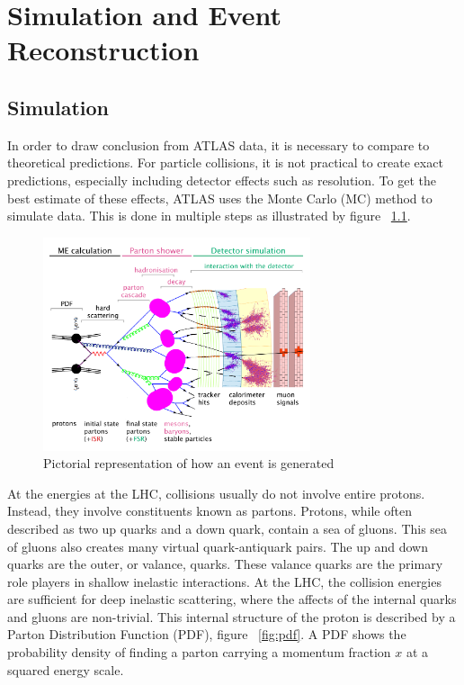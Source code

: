 \chapter{Simulation and Event Reconstruction}

\section{Simulation}
In order to draw conclusion from ATLAS data, it is necessary to compare to theoretical predictions. For particle collisions, it is not practical to create exact predictions, especially including detector effects such as resolution. To get the best estimate of these effects, ATLAS uses the Monte Carlo (MC) method to simulate data. This is done in multiple steps as illustrated by figure ~\ref{fig:eventsim}. \newline

\begin{figure}[h]
\begin{center}
\includegraphics*[width=0.70\textwidth] {figures/event_simulation}
\caption{Pictorial representation of how an event is generated \cite{Wanotayaroj:2242196}}
\label{fig:eventsim}
\end{center}
\end{figure}


\indent At the energies at the LHC, collisions usually do not involve entire protons. Instead, they involve constituents known as partons. Protons, while often described as two up quarks and a down quark, contain a sea of gluons. This sea of gluons also creates many virtual quark-antiquark pairs. The up and down quarks are the outer, or valance, quarks. These valance quarks are the primary role players in shallow inelastic interactions. At the LHC, the collision energies are sufficient for deep inelastic scattering, where the affects of the internal quarks and gluons are non-trivial. This internal structure of the proton is described  by a Parton Distribution Function (PDF), figure ~\ref{fig:pdf}. A PDF shows the probability density of finding a parton carrying a momentum fraction ${x}$ at a squared energy scale. %
\newline

